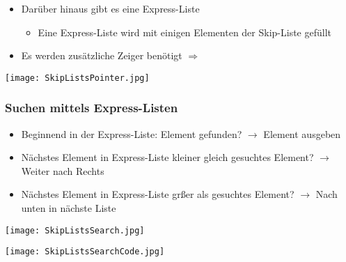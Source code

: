 			\begin{minipage}{0.5\textwidth}
				\begin{itemize}
					\item Darüber hinaus gibt es eine Express-Liste
						\begin{itemize}
							\item Eine Express-Liste wird mit einigen Elementen der Skip-Liste gefüllt
						\end{itemize}
					\item Es werden zusätzliche Zeiger benötigt $\Rightarrow$
				\end{itemize}
			\end{minipage}
			\hspace{1.5cm}
			\begin{minipage}{0.45\textwidth}
				\begin{center}
					\texttt{[image: SkipListsPointer.jpg]}
				\end{center}
			\end{minipage}

		
		\subsubsection{Suchen mittels Express-Listen}
			\begin{itemize}
				\item Beginnend in der Express-Liste: Element gefunden? $\rightarrow$ Element ausgeben
				\item Nächstes Element in Express-Liste kleiner gleich gesuchtes Element? $\rightarrow$ Weiter nach Rechts
				\item Nächstes Element in Express-Liste gr\ss er als gesuchtes Element? $\rightarrow$ Nach unten in nächste Liste
			\end{itemize}

			\begin{minipage}{0.5\textwidth}
				\begin{center}
					\texttt{[image: SkipListsSearch.jpg]}
				\end{center}
			\end{minipage}
			\begin{minipage}{0.45\textwidth}
				\begin{center}
					\texttt{[image: SkipListsSearchCode.jpg]}
				\end{center}
			\end{minipage}


